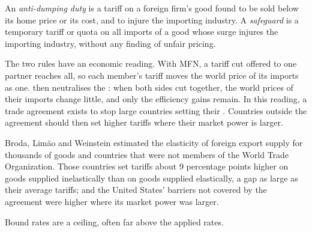 \begin{definition}\label{def:b3:trade-policy:antidumping}
An \emph{anti-dumping duty} is a tariff on a foreign firm's good found to be sold
below its home price or its cost, and to injure the importing industry. A
\emph{safeguard} is a temporary tariff or quota on all imports of a good whose
surge injures the importing industry, without any finding of unfair pricing.
\end{definition}

The two rules have an economic reading. With MFN, a tariff cut offered to one
partner reaches all, so each member's tariff moves the world price of its imports
as one.  then neutralises the : when both sides cut
together, the world prices of their imports change little, and only the efficiency
gains remain. In this reading, a trade agreement exists to stop large countries
setting their . Countries outside the agreement should then set
higher tariffs where their market power is larger.

\begin{record}
Broda, Limão and Weinstein estimated the elasticity of foreign export supply for
thousands of goods and countries that were not members of the World Trade
Organization. Those countries set tariffs about 9 percentage points higher on
goods supplied inelastically than on goods supplied elastically, a gap as large
as their average tariffs; and the United States' barriers not covered by the
agreement were higher where its market power was larger. %
\end{record}

Bound rates are a ceiling, often far above the applied rates.

